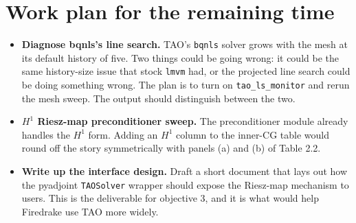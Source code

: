 \documentclass[a4paper,11pt]{article}
\begin{document}
\section{Work plan for the remaining time}

\begin{itemize}
\setlength{\itemsep}{2pt}
  \item \textbf{Diagnose bqnls's line search.} TAO's \texttt{bqnls} solver grows with the mesh at its default history of five. Two things could be going wrong: it could be the same history-size issue that stock \texttt{lmvm} had, or the projected line search could be doing something wrong. The plan is to turn on \texttt{tao\_ls\_monitor} and rerun the mesh sweep. The output should distinguish between the two.
  \item \textbf{$H^{1}$ Riesz-map preconditioner sweep.} The preconditioner module already handles the $H^{1}$ form. Adding an $H^{1}$ column to the inner-CG table would round off the story symmetrically with panels (a) and (b) of Table 2.2.
  \item \textbf{Write up the interface design.} Draft a short document that lays out how the pyadjoint \texttt{TAOSolver} wrapper should expose the Riesz-map mechanism to users. This is the deliverable for objective 3, and it is what would help Firedrake use TAO more widely.
\end{itemize}

\vspace{-0.5em}

{\footnotesize


}
\end{document}
